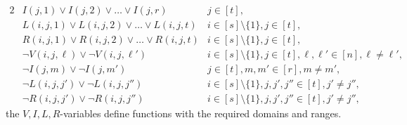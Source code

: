 \begin{alignat}{2}
\label{refclause:I-dom} & I(j,1) \lor I(j,2) \lor \ldots \lor I(j,r)  & j\! \in \! [t], \\
\label{refclause:L-dom} & L(i,j,1) \lor L(i,j,2) \lor \ldots \lor L(i,j,t)  & i \! \in \! [s] \! \setminus \! \{1\}, j\! \in \! [t], \\
\label{refclause:R-dom} & R(i,j,1) \lor R(i,j,2) \lor \ldots \lor R(i,j,t)  & i \! \in \! [s] \! \setminus \! \{1\}, j\! \in \! [t], \\
\label{refclause:V-func} & \neg V(i,j,\ell) \lor \neg V(i,j,\ell')  & i \! \in \! [s] \! \setminus \! \{1\}, j\! \in \! [t], \ell,\ell' \! \in \! [n], \ell \neq \ell',\\
\label{refclause:I-func} & \neg I(j,m) \lor \neg I(j,m')  &  j\! \in \! [t], m,m' \! \in \! [r], m \neq m',\\
\label{refclause:L-func} & \neg L(i,j,j') \lor \neg L(i,j,j'')  & i \! \in \! [s] \! \setminus \! \{1\}, j,j',j'' \! \in \! [t], j' \neq j'',\\
\label{refclause:R-func} & \neg R(i,j,j') \lor \neg R(i,j,j'')  & i \! \in \! [s] \! \setminus \! \{1\}, j,j',j'' \! \in \! [t], j' \neq j'', 
\end{alignat}
the $V,I,L,R$-variables define functions with the required domains and ranges.




